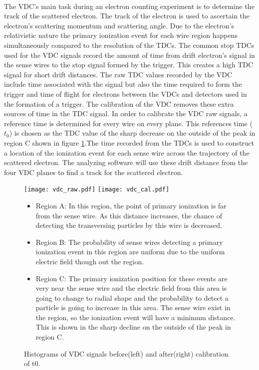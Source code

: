 	\paragraph{}The VDC's main task during an electron counting experiment is to determine the track of the scattered electron. The track of the electron is used to ascertain the electron's scattering momentum and scattering angle. Due to the electron's relativistic nature the primary ionization event for each wire region happens simultaneously compared to the resolution of the TDCs. The common stop TDCs used for the VDC signals record the amount of time from drift electron's signal in the sense wires to the stop signal formed by the trigger. This creates a high TDC signal for short drift distances. The raw TDC values recorded by the VDC include time associated with the signal but also the time required to form the trigger and time of flight for electrons between the VDCs and detectors used in the formation of a trigger. The calibration of the VDC removes these extra sources of time in the TDC signal. In order to calibrate the VDC raw signals, a reference time is determined for every wire on every plane. This references time ($t_0$) is chosen as the TDC value of the sharp decrease on the outside of the peak in region C shown in figure \ref{fig:vdcraw}.The time recorded from the TDCs is used to construct a location of the ionization event for each sense wire across the trajectory of the scattered electron. The analyzing software will use these drift distance from the four VDC planes to find a track for the scattered electron.
	\begin{figure}[H]
		\centering
		\texttt{[image: vdc\_raw.pdf]}
		\texttt{[image: vdc\_cal.pdf]}
		\caption{Histograms of VDC signals before(left) and after(right) calibration of t0\cite{primer}.}
		\label{fig:vdcraw}
	\begin{itemize}
		\item Region A: In this region, the point of primary ionization is far from the sense wire. As this distance increases, the chance of detecting the transversing particles by this wire is decreased. 
		\item Region B: The probability of sense wires detecting a primary ionization event in this region are uniform due to the uniform electric field though out the region. 
		\item Region C: The primary ionization position for these events are very near the sense wire and the electric field from this area is going to change to radial shape and the 	probability to detect a particle is going to increase in this area. The sense wire exist in the region, so the ionization event will have a minimum distance. This is shown in the sharp decline on the outside of the peak in region C. 
		\cite{primer}
	\end{itemize}	
	\end{figure}



